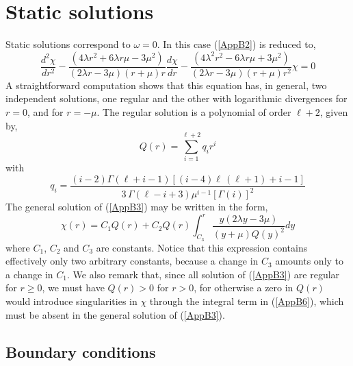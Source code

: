 \documentclass[12pt,aps,floats,showpacs,amssymb,tightenlines]{revtex4}
\begin{document}
\section{Static solutions}


Static solutions correspond to  $\omega=0$. In this case
(\ref{AppB2}) is reduced to,
\begin{equation}
\label{AppB3} {\frac {d^2 \chi}{d{r}^{2}}}
 -{\frac { \left(
4 \lambda {r}^{2}+6  \lambda r\mu -3{\mu}^{2} \right)  }{
 \left( 2  \lambda  r-3\mu \right)  \left( r+\mu
 \right) r}}{\frac {d \chi}{dr}} -{\frac { \left( 4{\lambda}^{2}{r}^{2}-6
\lambda  r\mu+3{\mu}^{2} \right)
  }{ \left( 2  \lambda  r-3\mu \right)
 \left( r+\mu \right) {r}^{2}}}{\chi} =0
\end{equation}
A straightforward computation shows that this equation has, in
general, two independent solutions, one regular and the other with
logarithmic divergences for $r=0$, and for $r=-\mu$.  The regular
solution is a polynomial of order $\ell+2$, given by,
\begin{equation}
\label{AppB4}
 Q(r)=\sum_{i=1}^{\ell +2} q_i r^i
\end{equation}
with
\begin{equation}
\label{AppB5}
  q_{{i}}={\frac { \left( i-2 \right) \Gamma  \left( {\ell}+i-1 \right)  \left[  \left( i-4 \right)
   {\ell}\, \left( {\ell}
+1 \right) +i-1 \right] } { 3\, \Gamma( {\ell}-i+3) {\mu}^{i -1}
\left[ \Gamma( i )  \right] ^{2}}}
\end{equation}
The general solution of (\ref{AppB3}) may be written in the form,
\begin{equation}
\label{AppB6} \chi(r) = C_1 Q(r) + C_2 Q(r) \int_{C_3}^r{\frac{y (2
\lambda y -3 \mu)}{(y+\mu)Q(y)^2} dy}
\end{equation}
where $C_1$, $C_2$ and $C_3$ are constants. Notice that this
expression contains effectively only two arbitrary constants,
because a change in $C_3$ amounts only to a change in $C_1$. We also
remark that, since all solution of (\ref{AppB3}) are regular for $r
\geq 0$, we must have $Q(r) > 0$ for $r>0$, for otherwise a zero
 in $Q(r)$ would introduce singularities in $\chi$ through the integral term in (\ref{AppB6}), which must be absent in the general solution of (\ref{AppB3}).

\subsection{Boundary conditions}
\end{document}
